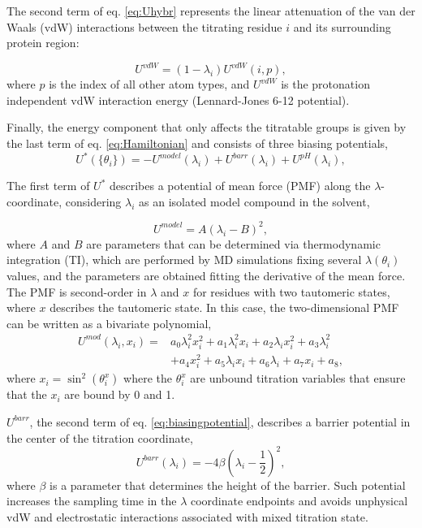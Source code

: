 \documentclass[9pt,tutorial]{livecoms}
\begin{document}
The second term of eq. \ref{eq:Uhybr} represents the linear attenuation of the van der Waals (vdW) interactions between the titrating residue $i$ and its surrounding protein region:

\begin{equation}
U^{vdW} = (1-\lambda_i)U^{vdW}(i, p),
\end{equation}
where $p$ is the index of all other atom types, and $U^{vdW}$ is the protonation independent vdW interaction energy (Lennard-Jones 6-12 potential).

Finally, the energy component that only affects the titratable groups is given by the last term of eq. \ref{eq:Hamiltonian} and consists of three biasing potentials, 
\begin{equation}
\label{eq:biasingpotential}
U^{\ast}(\{\theta_i\})=-U^{model}(\lambda_i)+U^{barr}(\lambda_i)+U^{pH}(\lambda_i),
\end{equation}

The first term of $U^{\ast}$ describes a potential of mean force (PMF) along the $\lambda$-coordinate, considering $\lambda_i$ as an isolated model compound in the solvent,

\begin{equation}
\label{eq:Umod_1d}
U^{model}=A(\lambda_i-B)^2,
\end{equation}
where $A$ and $B$ are parameters that can be determined via thermodynamic integration (TI), which are performed by MD simulations fixing several $\lambda(\theta_i)$ values, and the parameters are obtained fitting the derivative of the mean force. The PMF is second-order in $\lambda$ and $x$ for residues with two tautomeric states, where $x$ describes the tautomeric state. In this case, the two-dimensional PMF can be written as a bivariate polynomial,
%
\begin{equation}
\begin{split}
U^{mod}(\lambda_i,x_i) =
&a_0 \lambda_i^2 x_i^2 + a_1 \lambda_i^2 x_i + a_2 \lambda_i x_i^2 + a_3 \lambda_i^2 \\
&+ a_4 x_i^2 + a_5 \lambda_i x_i + a_6 \lambda_i + a_7 x_i + a_8,
\end{split}\label{eq:double}
\end{equation}
where $x_{i}=\sin^{2}\left(\theta^{x}_{i}\right)$ where the $\theta^{x}_{i}$ are unbound titration variables that ensure that the $x_{i}$ are bound by 0 and 1.
%

$U^{barr}$, the second term of eq. \ref{eq:biasingpotential}, describes a barrier potential in the center of the titration coordinate, 
%
\begin{equation}
U^{barr}(\lambda_i) = -4\beta\left(\lambda_i - \frac{1}{2} \right)^2,
\label{eq:Ubarr}
\end{equation}
where $\beta$ is a parameter that determines the height of the barrier. Such potential increases the sampling time in the $\lambda$  coordinate endpoints and avoids unphysical vdW and electrostatic interactions associated with mixed titration state. 
\end{document}

